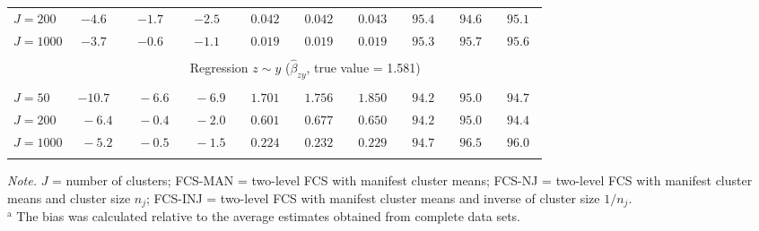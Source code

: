 \begin{table}
\begin{threeparttable}
\begin{tabular}{lccccccccc}
\nopagebreak $J=200$  & ${-}4.6\phantom{0}$ & ${-}1.7\phantom{0}$ & ${-}2.5\phantom{0}$ & $\phantom{0}0.042\phantom{0}$ & $\phantom{0}0.042\phantom{0}$ & $\phantom{0}0.043\phantom{0}$ & $\phantom{0}95.4\phantom{0}$ & $\phantom{0}94.6\phantom{0}$ & $\phantom{0}95.1\phantom{0}$ \\
\nopagebreak $J=1000$  & ${-}3.7\phantom{0}$ & ${-}0.6\phantom{0}$ & ${-}1.1\phantom{0}$ & $\phantom{0}0.019\phantom{0}$ & $\phantom{0}0.019\phantom{0}$ & $\phantom{0}0.019\phantom{0}$ & $\phantom{0}95.3\phantom{0}$ & $\phantom{0}95.7\phantom{0}$ & $\phantom{0}95.6\phantom{0}$ \\
[0.5ex]\hline\\[-2.0ex] 
& \multicolumn{9}{c}{Regression $z \sim y$ ($\hat\beta_{zy}$, true value = 1.581)} \\[0.4ex]\hline\\[-2.0ex]
\nopagebreak $J=50$  & ${-}10.7\phantom{0}$ & $\phantom{0}{-}6.6\phantom{0}$ & $\phantom{0}{-}6.9\phantom{0}$ & $\phantom{0}1.701\phantom{0}$ & $\phantom{0}1.756\phantom{0}$ & $\phantom{0}1.850\phantom{0}$ & $\phantom{0}94.2\phantom{0}$ & $\phantom{0}95.0\phantom{0}$ & $\phantom{0}94.7\phantom{0}$ \\
\nopagebreak $J=200$  & $\phantom{0}{-}6.4\phantom{0}$ & $\phantom{0}{-}0.4\phantom{0}$ & $\phantom{0}{-}2.0\phantom{0}$ & $\phantom{0}0.601\phantom{0}$ & $\phantom{0}0.677\phantom{0}$ & $\phantom{0}0.650\phantom{0}$ & $\phantom{0}94.2\phantom{0}$ & $\phantom{0}95.0\phantom{0}$ & $\phantom{0}94.4\phantom{0}$ \\
\nopagebreak $J=1000$  & $\phantom{0}{-}5.2\phantom{0}$ & $\phantom{0}{-}0.5\phantom{0}$ & $\phantom{0}{-}1.5\phantom{0}$ & $\phantom{0}0.224\phantom{0}$ & $\phantom{0}0.232\phantom{0}$ & $\phantom{0}0.229\phantom{0}$ & $\phantom{0}94.7\phantom{0}$ & $\phantom{0}96.5\phantom{0}$ & $\phantom{0}96.0\phantom{0}$ \\
[0.5ex]\hline\\[-1.8ex] 
\end{tabular}
\begin{tablenotes}{\footnotesize \textit{Note.} $J$ = number of clusters; FCS-MAN = two-level FCS with manifest cluster means; FCS-NJ = two-level FCS with manifest cluster means and cluster size $n_j$; FCS-INJ = two-level FCS with manifest cluster means and inverse of cluster size $1/n_j$.\\$^\text{a}$ The bias was calculated relative to the average estimates obtained from complete data sets.}\end{tablenotes}
\end{threeparttable}
\end{table}
